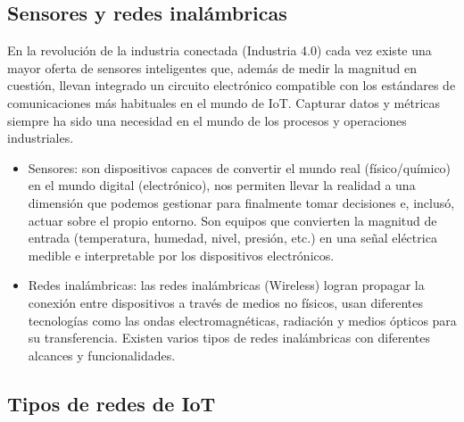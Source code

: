 \subsection{Sensores y redes inalámbricas}

En la revolución de la industria conectada (Industria 4.0) cada vez existe una mayor oferta de sensores inteligentes que, además de medir la magnitud en cuestión, llevan integrado un circuito electrónico compatible con los estándares de comunicaciones más habituales en el mundo de IoT. Capturar datos y métricas siempre ha sido una necesidad en el mundo de los procesos y operaciones industriales.

\begin{itemize}
\item Sensores: son dispositivos capaces de convertir el mundo real (físico/químico) en el mundo digital (electrónico), nos permiten llevar la realidad a una dimensión que podemos gestionar para finalmente tomar decisiones e, inclusó, actuar sobre el propio entorno. Son equipos que convierten la magnitud de entrada (temperatura, humedad, nivel, presión, etc.) en una señal eléctrica medible e interpretable por los dispositivos electrónicos.

\item Redes inalámbricas: las redes inalámbricas (Wireless) logran propagar la conexión entre dispositivos a través de medios no físicos, usan diferentes tecnologías como las ondas electromagnéticas, radiación y medios ópticos para su transferencia. Existen varios tipos de redes inalámbricas con diferentes alcances y funcionalidades.

\end{itemize}

\subsection{Tipos de redes de IoT}

